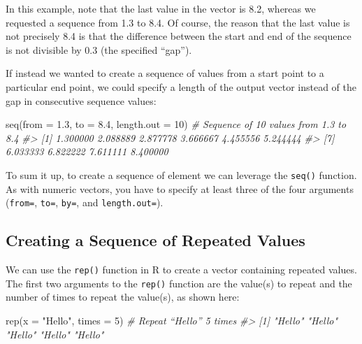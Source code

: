 \documentclass[
]{book}
\newenvironment{Shaded}{\begin{snugshade}}{\end{snugshade}}
\newcommand{\AttributeTok}[1]{\textcolor[rgb]{0.77,0.63,0.00}{#1}}
\newcommand{\CommentTok}[1]{\textcolor[rgb]{0.56,0.35,0.01}{\textit{#1}}}
\newcommand{\DecValTok}[1]{\textcolor[rgb]{0.00,0.00,0.81}{#1}}
\newcommand{\FloatTok}[1]{\textcolor[rgb]{0.00,0.00,0.81}{#1}}
\newcommand{\FunctionTok}[1]{\textcolor[rgb]{0.00,0.00,0.00}{#1}}
\newcommand{\NormalTok}[1]{#1}
\newcommand{\StringTok}[1]{\textcolor[rgb]{0.31,0.60,0.02}{#1}}
\begin{document}
In this example, note that the last value in the vector is 8.2, whereas we requested a sequence from 1.3 to 8.4. Of course, the reason that the last value is not precisely 8.4 is that the difference between the start and end of the sequence is not divisible by 0.3 (the specified ``gap'').

If instead we wanted to create a sequence of values from a start point to a particular end point, we could specify a length of the output vector instead of the gap in consecutive sequence values:

\begin{Shaded}
\begin{Highlighting}[]
\FunctionTok{seq}\NormalTok{(}\AttributeTok{from =} \FloatTok{1.3}\NormalTok{, }\AttributeTok{to =} \FloatTok{8.4}\NormalTok{, }\AttributeTok{length.out =} \DecValTok{10}\NormalTok{) }\CommentTok{\# Sequence of 10 values from 1.3 to 8.4}
\CommentTok{\#\textgreater{}  [1] 1.300000 2.088889 2.877778 3.666667 4.455556 5.244444}
\CommentTok{\#\textgreater{}  [7] 6.033333 6.822222 7.611111 8.400000}
\end{Highlighting}
\end{Shaded}

To sum it up, to create a sequence of element we can leverage the \texttt{seq()} function. As with numeric vectors, you have to specify at least three of the four arguments (\texttt{from=}, \texttt{to=}, \texttt{by=}, and \texttt{length.out=}).

\hypertarget{creating-a-sequence-of-repeated-values}{%
\subsection{Creating a Sequence of Repeated Values}\label{creating-a-sequence-of-repeated-values}}

We can use the \texttt{rep()} function in R to create a vector containing repeated values. The first two arguments to the \texttt{rep()} function are the value(s) to repeat and the number of times to repeat the value(s), as shown here:

\begin{Shaded}
\begin{Highlighting}[]
\FunctionTok{rep}\NormalTok{(}\AttributeTok{x =} \StringTok{"Hello"}\NormalTok{, }\AttributeTok{times =} \DecValTok{5}\NormalTok{) }\CommentTok{\# Repeat “Hello” 5 times}
\CommentTok{\#\textgreater{} [1] "Hello" "Hello" "Hello" "Hello" "Hello"}
\end{Highlighting}
\end{Shaded}
\end{document}

